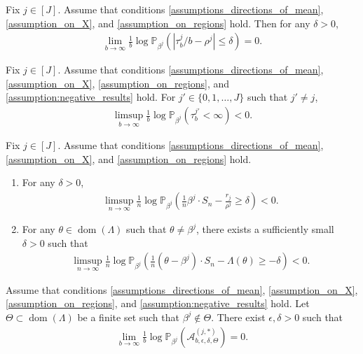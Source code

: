 \documentclass[10pt,a4paper]{amsart}
\newcommand{\Pro}{{\mathbb{P}}}
\begin{document}
\begin{lemma}\label{lemma:aux_prob1}
    Fix $j \in [J]$. 
    Assume that conditions \eqref{assumptions_directions_of_mean}, \eqref{assumption_on_X}, and \eqref{assumption_on_regions} hold.  Then 
    for any $\delta > 0$,
        \begin{align*}
              \lim_{b \to \infty} \frac{1}{b}  \log \Pro_{\beta^j}\left(\left|{\tau_b^j}/{b} - \rho^{j}\right| \leq \delta  \right) = 0.
        \end{align*}
\end{lemma}

\begin{lemma}\label{lemma:aux_prob2}
    Fix $j \in [J]$. 
    Assume that conditions \eqref{assumptions_directions_of_mean}, \eqref{assumption_on_X},  \eqref{assumption_on_regions}, and \eqref{assumption:negative_results} hold.  For $j' \in \{0,1,\ldots,J\}$ such that $j' \neq j$,
        \begin{align*}
          \limsup_{b \to \infty} \frac{1}{b}  \log \Pro_{\beta^j}\left(\tau_b^{j'} < \infty\right) < 0.
        \end{align*}  
\end{lemma}

\begin{lemma}\label{lemma:aux_prob34}
    Fix $j \in [J]$. 
    Assume that conditions \eqref{assumptions_directions_of_mean}, \eqref{assumption_on_X}, and \eqref{assumption_on_regions} hold.  
    \begin{enumerate}[label=(\roman*)]
        \item For any $\delta >0$,
        \begin{align*}
          \limsup_{n \to \infty} \frac{1}{n}  \log \Pro_{\beta^j}\left( \frac{1}{n}\beta^j \cdot S_n -\frac{r_j}{\rho^j} \geq \delta  \right) < 0.
        \end{align*}
        \item For any $\theta \in \operatorname{dom}(\Lambda)$ such that $\theta \neq \beta^j$, there exists a sufficiently small $\delta > 0$ such that
        \begin{align*}
          \limsup_{n \to \infty} \frac{1}{n}  \log \Pro_{\beta^j}\left( \frac{1}{n}(\theta -\beta^j) \cdot S_n -\Lambda(\theta) \geq -\delta  \right) < 0.
        \end{align*}      
    \end{enumerate}
\end{lemma}

\begin{lemma}\label{aux_lemma_overall}
    Assume that conditions \eqref{assumptions_directions_of_mean}, \eqref{assumption_on_X},  \eqref{assumption_on_regions}, and \eqref{assumption:negative_results} hold.    Let   $\Theta \subset \operatorname{dom}(\Lambda)$ be a finite set such that $\beta^j \not \in \Theta$. There exist  $\epsilon, \delta > 0$ such that
    \begin{align*}
       \lim_{b \to \infty}  \frac{1}{b} \log \Pro_{\beta^j}\left(\mathcal{A}_{b,\epsilon,\delta,\Theta}^{(j,*)} \right) = 0.
    \end{align*}
\end{lemma}
\end{document}
